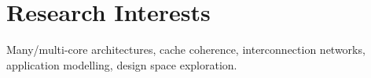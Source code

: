 \section{\sc Research Interests}
Many/multi-core architectures, cache coherence, interconnection networks, application modelling, design space exploration.
